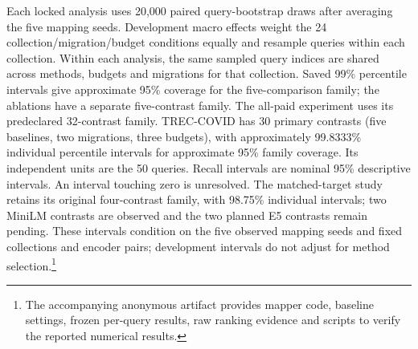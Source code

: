 Each locked analysis uses 20,000 paired query-bootstrap draws after
averaging the five mapping seeds. Development macro effects weight the
24 collection/migration/budget conditions equally and resample queries
within each collection. Within each analysis, the same sampled query indices
are shared across methods, budgets and migrations for that collection.
Saved 99\% percentile intervals give approximate
95\% coverage for the five-comparison family; the ablations have a separate
five-contrast family. The all-paid experiment uses its predeclared
32-contrast family. TREC-COVID has 30 primary contrasts
(five baselines, two migrations, three budgets), with approximately
99.8333\% individual percentile intervals for approximate 95\% family
coverage. Its independent units are the 50 queries. Recall intervals are
nominal 95\% descriptive intervals. An interval touching zero is unresolved.
The matched-target study retains its original four-contrast family, with
98.75\% individual intervals; two MiniLM contrasts are observed and the two
planned E5 contrasts remain pending.
These intervals condition on the five observed mapping seeds and fixed
collections and encoder pairs; development intervals do not adjust for
method selection.\footnote{The accompanying anonymous artifact provides
mapper code, baseline settings, frozen per-query results, raw ranking evidence
and scripts to verify the reported numerical results.}

